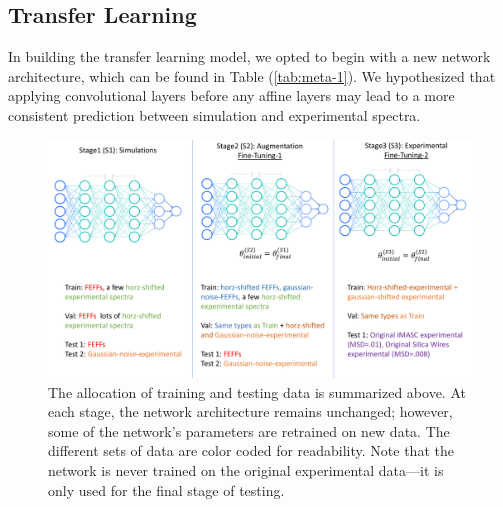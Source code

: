 \subsection{Transfer Learning}
In building the transfer learning model, we opted to begin with a new network architecture, which can be found in Table (\ref{tab:meta-1}). We hypothesized that applying convolutional layers before any affine layers may lead to a more consistent prediction between simulation and experimental spectra.

\begin{figure}
    \centering
    \includegraphics[width=\linewidth]{Chapters/Figures/transfer-learning-breakdown.pdf}
    \caption[Transfer Learning Process]{The allocation of training and testing data is summarized above. At each stage, the network architecture remains unchanged; however, some of the network's parameters are retrained on new data. The different sets of data are color coded for readability. Note that the network is never trained on the original experimental data---it is only used for the final stage of testing.}
    \label{fig:transfer-learning-databreakdown}
\end{figure}

